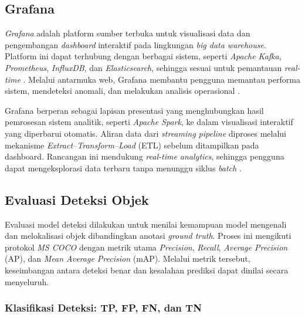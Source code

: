 \subsection{Grafana}

\textit{Grafana} adalah platform sumber terbuka untuk visualisasi data dan
pengembangan \textit{dashboard} interaktif pada lingkungan
\textit{big data warehouse}. Platform ini dapat terhubung dengan berbagai sistem,
seperti \textit{Apache Kafka}, \textit{Prometheus}, \textit{InfluxDB}, dan
\textit{Elasticsearch}, sehingga sesuai untuk pemantauan \textit{real-time}
\cite{sutanto2025wazuhgrafana}. Melalui antarmuka web, Grafana membantu pengguna
memantau performa sistem, mendeteksi anomali, dan melakukan analisis
operasional .

Grafana berperan sebagai lapisan presentasi yang menghubungkan hasil
pemrosesan sistem analitik, seperti \textit{Apache Spark}, ke dalam
visualisasi interaktif yang diperbarui otomatis. Aliran data dari
\textit{streaming pipeline} diproses melalui mekanisme
\textit{Extract--Transform--Load} (ETL) sebelum ditampilkan pada dashboard.
Rancangan ini mendukung \textit{real-time analytics}, sehingga
pengguna dapat mengeksplorasi data terbaru tanpa menunggu siklus
\textit{batch} \cite{devireddy2020realtimewarehouse}.

\subsection{Evaluasi Deteksi Objek}

Evaluasi model deteksi dilakukan untuk menilai kemampuan model mengenali dan
melokalisasi objek dibandingkan anotasi \textit{ground truth}. Proses ini
mengikuti protokol \textit{MS COCO} \cite{lin2014microsoft} dengan metrik
utama \textit{Precision}, \textit{Recall}, \textit{Average Precision} (AP),
dan \textit{Mean Average Precision} (mAP). Melalui metrik tersebut,
keseimbangan antara deteksi benar dan kesalahan prediksi dapat dinilai secara
menyeluruh.

\subsubsection{Klasifikasi Deteksi: TP, FP, FN, dan TN}

